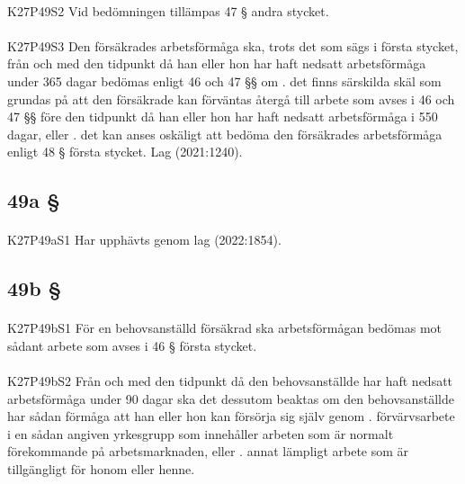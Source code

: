 \documentclass[a4paper,notitlepage,openany,10pt]{book}
\begin{document}
\paragraph*{}
{\tiny K27P49S2}
Vid bedömningen tillämpas 47 § andra stycket.
\paragraph*{}
{\tiny K27P49S3}
Den försäkrades arbetsförmåga ska, trots det som sägs i första stycket, från och med den tidpunkt då han eller hon har haft nedsatt arbetsförmåga under 365 dagar bedömas enligt 46 och 47 §§ om
. det finns särskilda skäl som grundas på att den försäkrade kan förväntas återgå till arbete som avses i 46 och 47 §§ före den tidpunkt då han eller hon har haft nedsatt arbetsförmåga i 550 dagar, eller
. det kan anses oskäligt att bedöma den försäkrades arbetsförmåga enligt 48 § första stycket.
Lag (2021:1240).
\subsection*{49a §}
\paragraph*{}
{\tiny K27P49aS1}
Har upphävts genom
lag (2022:1854).
\subsection*{49b §}
\paragraph*{}
{\tiny K27P49bS1}
För en behovsanställd försäkrad ska arbetsförmågan bedömas mot sådant arbete som avses i 46 § första stycket.
\paragraph*{}
{\tiny K27P49bS2}
Från och med den tidpunkt då den behovsanställde har haft nedsatt arbetsförmåga under 90 dagar ska det dessutom beaktas om den behovsanställde har sådan förmåga att han eller hon kan försörja sig själv genom
. förvärvsarbete i en sådan angiven yrkesgrupp som innehåller arbeten som är normalt förekommande på arbetsmarknaden, eller
. annat lämpligt arbete som är tillgängligt för honom eller henne.
\end{document}
